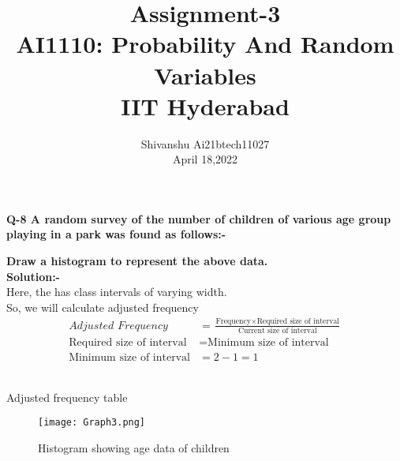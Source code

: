 \documentclass[12pt]{IEEEtran}
\title{\textbf{Assignment-3}\\ \large AI1110: Probability And Random Variables\\ IIT Hyderabad}
\author{Shivanshu  Ai21btech11027\\ April 18,2022}
\begin{document}
    \maketitle
    \textbf{Q-8 A random survey of the number of children of various age group playing in a park was found as follows:-}\\
   
    \begin{center}
        
    \end{center}
    \textbf{Draw a histogram to represent the above data.}\\
    
    \textbf{Solution:-}\\
    Here, the has class intervals of varying width.\\
    So, we will calculate adjusted frequency\\

    \begin{align}
        \textit{Adjusted Frequency} &= \tfrac{ \text{Frequency} \times \text{Required size of interval}}{\text{Current size of interval}}\\
        \text{Required size of interval} &= \text{Minimum size of interval}\\
        \text{Minimum size of interval} &= 2-1 =1
    \end{align}

    \begin{center}
        
        \label{table:table_3}
        \vspace{5mm}\\
        \caption{Adjusted frequency table}
    \end{center}
    
    \begin{figure}[h]
        \begin{center}
        \texttt{[image: Graph3.png]}
        \caption{Histogram showing age data of children}
        \label{fig.}
        \end{center}
    \end{figure}
 
\end{document}
